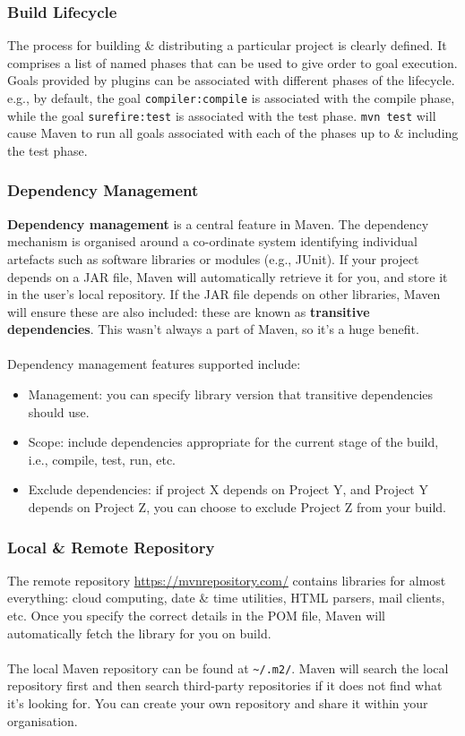 \documentclass[a4paper,11pt]{article}
\begin{document}
\subsubsection{Build Lifecycle}
The process for building \& distributing a particular project is clearly defined. 
It comprises a list of named phases that can be used to give order to goal execution.
Goals provided by plugins can be associated with different phases of the lifecycle.
e.g., by default, the goal \verb|compiler:compile| is associated with the compile phase, while the goal
\verb|surefire:test| is associated with the test phase.
\texttt{mvn test} will cause Maven to run all goals associated with each of the phases up to \& including
the test phase.

\subsubsection{Dependency Management}
\textbf{Dependency management} is a central feature in Maven.
The dependency mechanism is organised around a co-ordinate system identifying individual artefacts such as software 
libraries or modules (e.g., JUnit).
If your project depends on a JAR file, Maven will automatically retrieve it for you, and store it in the user's local
repository.
If the JAR file depends on other libraries, Maven will ensure these are also included: these are known as 
\textbf{transitive dependencies}.
This wasn't always a part of Maven, so it's a huge benefit.
\\\\
Dependency management features supported include:
\begin{itemize}
    \item   Management: you can specify library version that transitive dependencies should use.
    \item   Scope: include dependencies appropriate for the current stage of the build, i.e., compile, test, run, etc.
    \item   Exclude dependencies: if project X depends on Project Y, and Project Y depends on Project Z, you can choose
            to exclude Project Z from your build.
\end{itemize}

\subsubsection{Local \& Remote Repository}
The remote repository \url{https://mvnrepository.com/} contains libraries for almost everything: cloud computing,
date \& time utilities, HTML parsers, mail clients, etc.
Once you specify the correct details in the POM file, Maven will automatically fetch the library for you on build.
\\\\
The local Maven repository can be found at \verb|~/.m2/|.
Maven will search the local repository first and then search third-party repositories if it does not find what it's looking
for.
You can create your own repository and share it within your organisation.
\end{document}
